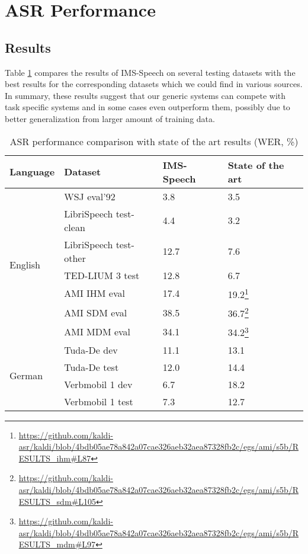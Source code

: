 \documentclass[12pt,a4paper]{article}
\begin{document}
\section{ASR Performance}
\subsection{Results}
Table \ref{tab:results}
compares the results of IMS-Speech on several testing datasets with
the best results for the corresponding datasets which we could
find in various sources.
In summary, these results suggest that our generic systems
can compete with task specific systems and in some cases even outperform them,
possibly due to better generalization from larger amount of training data.

\begin{savenotes}
\begin{table}[H]
 \centering
  \caption{ASR performance comparison with state of the art results (WER, \%)}
  \footnotesize
  \begin{tabular}{|l|l|l|l|}
    \hline
    \textbf{Language} & \textbf{Dataset} & \textbf{IMS-Speech} & \textbf{State of the art} \\
    \hline
    \multirow[t]{7}{*}{English} & WSJ eval'92 & 3.8 & 3.5 \cite{chan2015deep} \\
    \cline{2-4}
    & LibriSpeech test-clean & 4.4 & 3.2 \cite{han2017capio} \\
    \cline{2-4}
    & LibriSpeech test-other & 12.7 & 7.6 \cite{han2017capio} \\
    \cline{2-4}
    & TED-LIUM 3 test & 12.8 & 6.7 \cite{hernandez2018ted} \\
    \cline{2-4}
    & AMI IHM eval & 17.4 & 19.2\footnote{\url{https://github.com/kaldi-asr/kaldi/blob/4bdb05ae78a842a07cae326aeb32aea87328fb2c/egs/ami/s5b/RESULTS_ihm\#L87}} \\
    \cline{2-4}
    & AMI SDM eval & 38.5 & 36.7\footnote{\url{https://github.com/kaldi-asr/kaldi/blob/4bdb05ae78a842a07cae326aeb32aea87328fb2c/egs/ami/s5b/RESULTS_sdm\#L105}} \\
    \cline{2-4}
    & AMI MDM eval & 34.1 & 34.2\footnote{\url{https://github.com/kaldi-asr/kaldi/blob/4bdb05ae78a842a07cae326aeb32aea87328fb2c/egs/ami/s5b/RESULTS_mdm\#L97}} \\
    \hline
    \multirow[t]{4}{*}{German} & Tuda-De dev & 11.1 & 13.1 \cite{milde-koehn-18-german-asr} \\
    \cline{2-4}
    & Tuda-De test & 12.0 & 14.4 \cite{milde-koehn-18-german-asr} \\
    \cline{2-4}
    & Verbmobil 1 dev & 6.7 & 18.2 \cite{milde-koehn-18-german-asr} \\
    \cline{2-4}
    & Verbmobil 1 test & 7.3 & 12.7 \cite{gaida2014comparing} \\
    \hline
  \end{tabular}
  \label{tab:results}
\end{table}
\end{savenotes}
\end{document}
